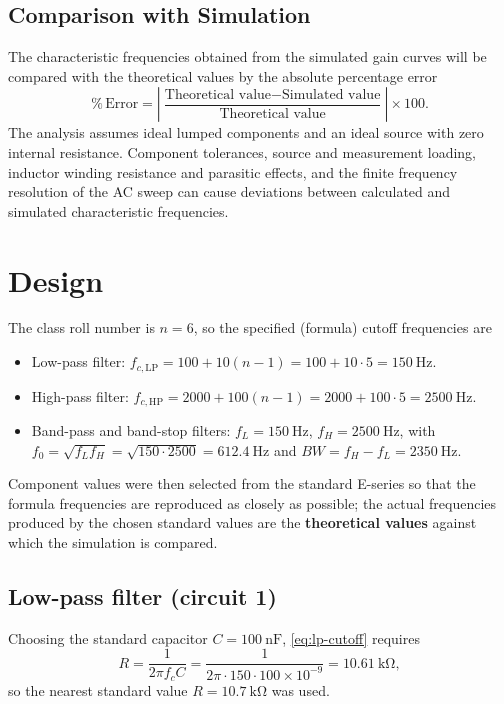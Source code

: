 \documentclass[12pt,a4paper]{article}
\begin{document}
	\subsection{Comparison with Simulation}
	
	The characteristic frequencies obtained from the simulated gain curves will be compared with the theoretical values by the absolute percentage error
	\begin{equation}
		\%\,\mathrm{Error}
		=\left|\frac{\text{Theoretical value}-\text{Simulated value}}
		{\text{Theoretical value}}\right|\times100.
		\label{eq:percentage-error}
	\end{equation}
	The analysis assumes ideal lumped components and an ideal source with zero internal resistance. Component tolerances, source and measurement loading, inductor winding resistance and parasitic effects, and the finite frequency resolution of the AC sweep can cause deviations between calculated and simulated characteristic frequencies.
	
	
	\section{Design}
	The class roll number is $n = 6$, so the specified (formula) cutoff
	frequencies are
	\begin{itemize}
		\item Low-pass filter:
		$f_{c,\mathrm{LP}} = 100 + 10(n-1) = 100 + 10\cdot 5
		= \SI{150}{\hertz}$.
		\item High-pass filter:
		$f_{c,\mathrm{HP}} = 2000 + 100(n-1) = 2000 + 100\cdot 5
		= \SI{2500}{\hertz}$.
		\item Band-pass and band-stop filters:
		$f_{L} = \SI{150}{\hertz}$, $f_{H} = \SI{2500}{\hertz}$, with
		$f_{0} = \sqrt{f_{L}f_{H}} = \sqrt{150\cdot 2500}
		= \SI{612.4}{\hertz}$ and
		$BW = f_{H}-f_{L} = \SI{2350}{\hertz}$.
	\end{itemize}
	
	Component values were then selected from the standard E-series so that
	the formula frequencies are reproduced as closely as possible; the
	actual frequencies produced by the chosen standard values are the
	\textbf{theoretical values} against which the simulation is compared.
	
	\subsection{Low-pass filter (circuit 1)}
	Choosing the standard capacitor $C = \SI{100}{\nano\farad}$,
	\eqref{eq:lp-cutoff} requires
	\[
	R = \frac{1}{2\pi f_{c} C}
	= \frac{1}{2\pi \cdot 150 \cdot 100\times 10^{-9}}
	= \SI{10.61}{\kilo\ohm},
	\]
	so the nearest standard value $R = \SI{10.7}{\kilo\ohm}$ was used.
	
\end{document}
